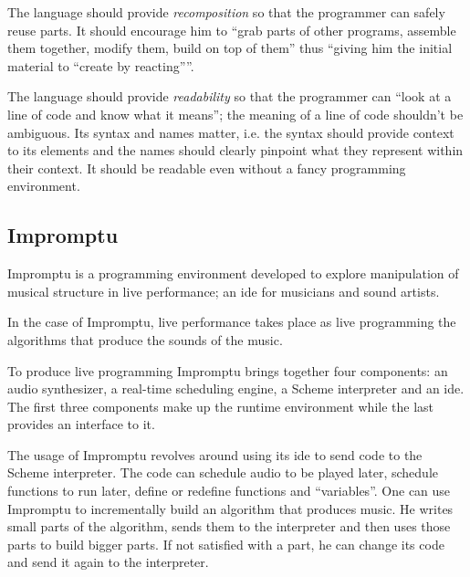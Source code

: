 \documentclass{./llncs2e/llncs}
\begin{document}
	The language should provide \emph{recomposition} so that the programmer can safely reuse parts. 
	It should encourage him to ``grab parts of other programs, assemble them together, modify them, build on top of them'' thus ``giving him the initial material to ``create by reacting''''.

	The language should provide \emph{readability} so that the programmer can ``look at a line of code and know what it means''; the meaning of a line of code shouldn't be ambiguous. 
	Its syntax and names matter, i.e. the syntax should provide context to its elements and the names should clearly pinpoint what they represent within their context. 
	It should be readable even without a fancy programming environment.

\subsection{Impromptu\cite{sorensen2005impromptu}\cite{sorensen2010programming}}
	Impromptu is a programming environment developed to explore manipulation of musical structure in live performance; an \ac{ide} for musicians and sound artists.

	In the case of Impromptu, live performance takes place as live programming the algorithms that produce the sounds of the music.

	To produce live programming Impromptu brings together four components: an audio synthesizer, a real-time scheduling engine, a Scheme interpreter and an \ac{ide}. 
	The first three components make up the runtime environment while the last provides an interface to it. 

	The usage of Impromptu revolves around using its \ac{ide} to send code to the Scheme interpreter. 
	The code can schedule audio to be played later, schedule functions to run later, define or redefine functions and ``variables''. 
	One can use Impromptu to incrementally build an algorithm that produces music. 
	He writes small parts of the algorithm, sends them to the interpreter and then uses those parts to build bigger parts. 
	If not satisfied with a part, he can change its code and send it again to the interpreter.

\end{document}
